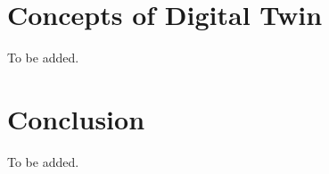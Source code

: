 \documentclass[article]{aaltoseries}
\begin{document}





\section{Concepts of Digital Twin}
To be added.




\section{Conclusion}

To be added.






\end{document}
